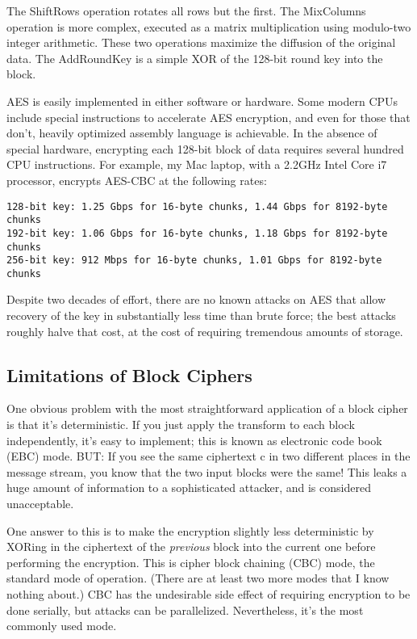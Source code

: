\documentclass[%
 aip,
 jmp,%
 amsmath,amssymb,
 reprint,%
]{revtex4-1}
\begin{document}
The ShiftRows operation rotates all rows but the first. The MixColumns operation is more complex, executed as a matrix multiplication using modulo-two integer arithmetic. These two operations maximize the diffusion of the original data. The AddRoundKey is a simple XOR of the 128-bit round key into the block.

AES is easily implemented in either software or hardware. Some modern CPUs include special instructions to accelerate AES encryption, and even for those that don't, heavily optimized assembly language is achievable.  In the absence of special hardware, encrypting each 128-bit block of data requires several hundred CPU instructions. For example, my Mac laptop, with a 2.2GHz Intel Core i7 processor, encrypts AES-CBC at the following rates:

\begin{widetext}
\begin{verbatim}
128-bit key: 1.25 Gbps for 16-byte chunks, 1.44 Gbps for 8192-byte chunks
192-bit key: 1.06 Gbps for 16-byte chunks, 1.18 Gbps for 8192-byte chunks
256-bit key: 912 Mbps for 16-byte chunks, 1.01 Gbps for 8192-byte chunks
\end{verbatim}
\end{widetext}

Despite two decades of effort, there are no known attacks on AES that allow recovery of the key in substantially less time than brute force; the best attacks roughly halve that cost, at the cost of requiring tremendous amounts of storage.

\subsection{Limitations of Block Ciphers}

One obvious problem with the most straightforward application of a
block cipher is that it's deterministic.  If you just apply the
transform to each block independently, it's easy to implement; this is
known as electronic code book (EBC) mode.  BUT: If you see the same
ciphertext c in two different places in the message stream, you know
that the two input blocks were the same!  This leaks a huge amount of
information to a sophisticated attacker, and is considered
unacceptable.

One answer to this is to make the encryption slightly less
deterministic by XORing in the ciphertext of the \emph{previous} block into
the current one before performing the encryption.  This is cipher
block chaining (CBC) mode, the standard mode of operation.  (There are
at least two more modes that I know nothing about.)  CBC has the
undesirable side effect of requiring encryption to be done serially,
but attacks can be parallelized.  Nevertheless, it's the most commonly
used mode.
\end{document}
